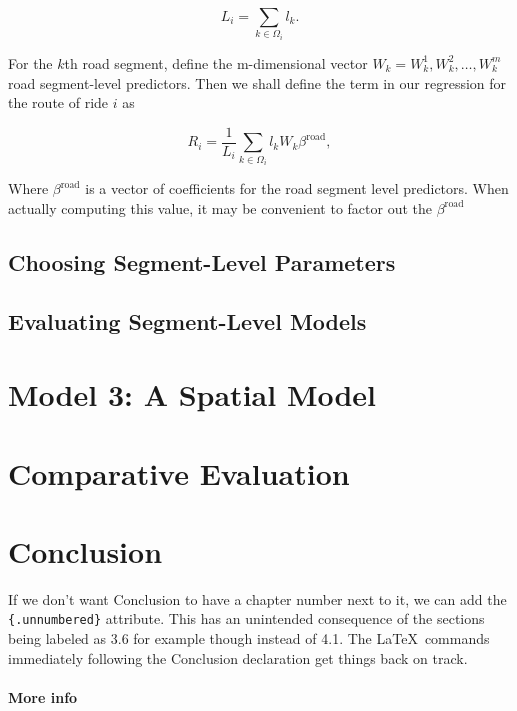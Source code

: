 \documentclass[12pt,twoside]{reedthesis}
\begin{document}
  \[ L_i = \sum_{k \in \Omega_i} l_k.\]
  
  For the \(k\)th road segment, define the m-dimensional vector
  \(W_k = W_k^1, W_k^2, \ldots, W_k^m\) road segment-level predictors.
  Then we shall define the term in our regression for the route of ride
  \(i\) as
  
  \[ R_i = \frac{1}{L_i} \sum_{k \in \Omega_i} l_k W_k \beta^{\text{road}},\]
  
  Where \(\beta^{\text{road}}\) is a vector of coefficients for the road
  segment level predictors. When actually computing this value, it may be
  convenient to factor out the \(\beta^{\text{road}}\)
  
  \section{Choosing Segment-Level
  Parameters}\label{choosing-segment-level-parameters}
  
  \section{Evaluating Segment-Level
  Models}\label{evaluating-segment-level-models}
  
  \chapter{Model 3: A Spatial Model}\label{model-3-a-spatial-model}
  
  \chapter{Comparative Evaluation}\label{comparative-evaluation}
  
  \chapter*{Conclusion}\label{conclusion}
  
  \setcounter{chapter}{4} \setcounter{section}{0}
  
  If we don't want Conclusion to have a chapter number next to it, we can
  add the \texttt{\{.unnumbered\}} attribute. This has an unintended
  consequence of the sections being labeled as 3.6 for example though
  instead of 4.1. The \LaTeX~commands immediately following the Conclusion
  declaration get things back on track.
  
  \subsubsection{More info}\label{more-info}
  
\end{document}
